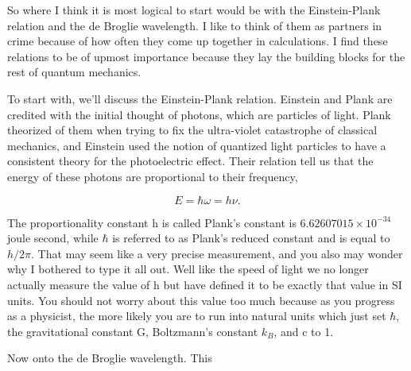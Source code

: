 \documentclass[preprint, review,12pt]{elsarticle}
\begin{document}
So where I think it is most logical to start would be with the Einstein-Plank relation and the de Broglie wavelength. I like to think of them as partners in crime because of how often they come up together in calculations. I find these relations to be of upmost importance because they lay the building blocks for the rest of quantum mechanics.

To start with, we'll discuss the Einstein-Plank relation. Einstein and Plank are credited with the initial thought of photons, which are particles of light. Plank theorized of them when trying to fix the ultra-violet catastrophe of classical mechanics, and Einstein used the notion of quantized light particles to have a consistent theory for the photoelectric effect. Their relation tell us that the energy of these photons are proportional to their frequency, 

\begin{equation}
    E = \hbar \omega = h \nu.
\end{equation}

The proportionality constant h is called Plank's constant is $6.62607015 \times 10^{-34}$ joule second, while $\hbar$ is referred to as Plank's reduced constant and is equal to $h/2\pi$. That may seem like a very precise measurement, and you also may wonder why I bothered to type it all out. Well like the speed of light we no longer actually measure the value of h but have defined it to be exactly that value in SI units. You should not worry about this value too much because as you progress as a physicist, the more likely you are to run into natural units which just set $\hbar$, the gravitational constant G, Boltzmann's constant $k_B$, and c to 1.

Now onto the de Broglie wavelength. This 






\end{document}
